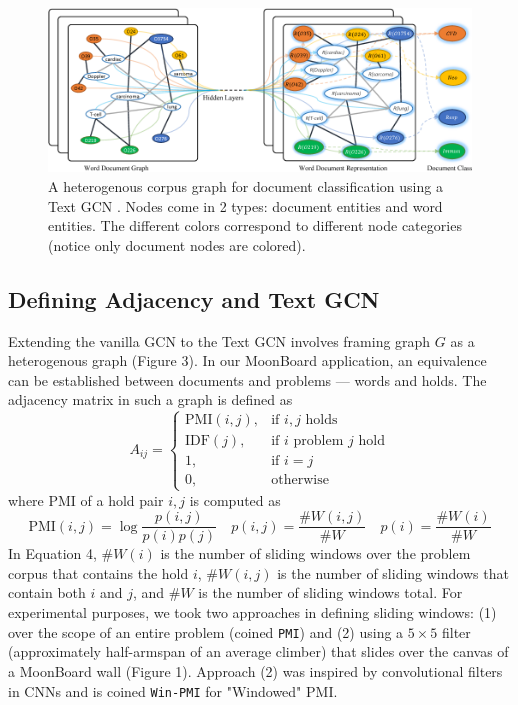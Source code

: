 \documentclass{article}
\begin{document}
\begin{figure}
\centering
\includegraphics[width=.5\linewidth]{textGCN}
\caption{A heterogenous corpus graph for document classification using a Text GCN \cite{yao2018graph}. Nodes come in 2 types: document entities and word entities. The different colors correspond to different node categories (notice only document nodes are colored).}
\label{fig: Corpus graph for Text Graph Convolutional Network}
\end{figure}

\subsection{Defining Adjacency and Text GCN}
Extending the vanilla GCN \cite{kipf2016semisupervised} to the Text GCN \cite{yao2018graph} involves framing graph $G$ as a heterogenous graph (Figure 3). In our MoonBoard application, an equivalence can be established between documents and problems --- words and holds. The adjacency matrix in such a graph is defined as
\begin{equation}
A_{ij}= 
\begin{cases}
    \text{PMI}(i, j), & \text{if } i, j \text{ holds} \\
    \text{IDF}(j), & \text{if } i \text{ problem } j \text{ hold} \\
    1, & \text{if } i=j \\
    0, & \text{otherwise}
\end{cases}
\end{equation}
where PMI of a hold pair $i, j$ is computed as
\begin{equation}
\text{PMI}(i, j) = \log\frac{p(i, j)}{p(i)p(j)}  \quad  p(i, j) = \frac{\#W(i, j)}{\#W}  \quad  p(i) = \frac{\#W(i)}{\#W}
\end{equation}
In Equation 4, $\#W(i)$ is the number of sliding windows over the problem corpus that contains the hold $i$, $\#W(i, j)$ is the number of sliding windows that contain both $i$ and $j$, and $\#W$ is the number of sliding windows total. For experimental purposes, we took two approaches in defining sliding windows: (1) over the scope of an entire problem (coined \texttt{PMI}) and (2) using a $5 \times 5$ filter (approximately half-armspan of an average climber) that slides over the canvas of a MoonBoard wall (Figure 1). Approach (2) was inspired by convolutional filters in CNNs and is coined \texttt{Win-PMI} for "Windowed" PMI.
\end{document}
